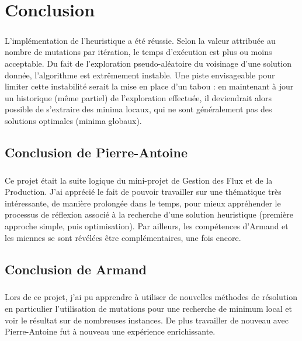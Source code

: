 \chapter{Conclusion}

\paragraph{}
L'implémentation de l'heuristique a été réussie.
Selon la valeur attribuée au nombre de mutations par itération, le temps d'exécution est plus ou moins acceptable.
Du fait de l'exploration pseudo-aléatoire du voisinage d'une solution donnée, l'algorithme est extrêmement instable.
Une piste envisageable pour limiter cette instabilité serait la mise en place d'un tabou : en maintenant à jour
un historique (même partiel) de l'exploration effectuée, il deviendrait alors possible de s'extraire des minima locaux,
qui ne sont généralement pas des solutions optimales (minima globaux).

\vfill

\section{Conclusion de Pierre-Antoine}

\paragraph{}
Ce projet était la suite logique du mini-projet de Gestion des Flux et de la Production.
J'ai apprécié le fait de pouvoir travailler sur une thématique très intéressante, de manière prolongée dans le temps,
pour mieux appréhender le processus de réflexion associé à la recherche d'une solution heuristique (première approche simple, puis optimisation).
Par ailleurs, les compétences d'Armand et les miennes se sont révélées être complémentaires, une fois encore.

\section{Conclusion de Armand}

\paragraph{}
Lors de ce projet, j'ai pu apprendre à utiliser de nouvelles méthodes de résolution en particulier l'utilisation de mutations pour une recherche de minimum local et voir le résultat sur de nombreuses instances. De plus travailler de nouveau avec Pierre-Antoine fut à nouveau une expérience enrichissante.

\vfill
